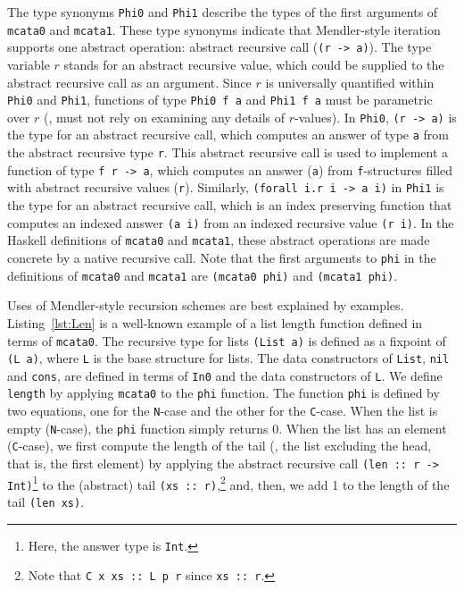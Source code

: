 The type synonyms \lstinline{Phi0} and \lstinline{Phi1} describe the types of
the first arguments of \lstinline{mcata0} and \lstinline{mcata1}.
These type synonyms indicate that Mendler-style iteration supports
one abstract operation: abstract recursive call (\lstinline{(r -> a)}).
The type variable $r$ stands for an abstract recursive value, which could
be supplied to the abstract recursive call as an argument. Since $r$ is
universally quantified within \lstinline{Phi0} and \lstinline{Phi1},
functions of type \lstinline{Phi0 f a} and \lstinline{Phi1 f a} must be
parametric over $r$ (\ie, must not rely on examining any details of $r$-values).
In \lstinline{Phi0}, \lstinline{(r -> a)} is the type for
an abstract recursive call, which computes an answer of type \lstinline{a}
from the abstract recursive type \lstinline{r}.
This abstract recursive call is used to implement a function of type
\lstinline{f r -> a}, which computes an answer (\lstinline{a}) from
\lstinline{f}-structures filled with abstract recursive values (\lstinline{r}).
Similarly, \lstinline{(forall i.r i -> a i)} in \lstinline{Phi1} is the type
for an abstract recursive call, which is an index preserving function that
computes an indexed answer \lstinline{(a i)} from an indexed recursive value
\lstinline{(r i)}. In the Haskell definitions of \lstinline{mcata0} and
\lstinline{mcata1}, these abstract operations are made concrete by
a native recursive call. Note that the first arguments to
\lstinline{phi} in the definitions of \lstinline{mcata0} and \lstinline{mcata1}
are \lstinline{(mcata0 phi)} and \lstinline{(mcata1 phi)}.

Uses of Mendler-style recursion schemes are best explained by examples.
Listing~\ref{lst:Len} is a well-known example of a list length function
defined in terms of \lstinline{mcata0}. The recursive type for lists
\lstinline{(List a)} is defined as a fixpoint of \lstinline{(L a)},
where \lstinline{L} is the base structure for lists. The data constructors
of \lstinline{List}, \lstinline{nil} and \lstinline{cons}, are defined
in terms of \lstinline{In0} and the data constructors of \lstinline{L}.
We define \lstinline{length} by applying \lstinline{mcata0} to
the \lstinline{phi} function. The function \lstinline{phi} is defined
by two equations, one for the \lstinline{N}-case and the other for
the \lstinline{C}-case. When the list is empty (\lstinline{N}-case),
the \lstinline{phi} function simply returns 0. When the list has an
element (\lstinline{C}-case), we first compute the length of the tail
(\ie, the list excluding the head, that is, the first element) by
applying the abstract recursive call \lstinline{(len :: r -> Int)}\footnote{
	Here, the answer type is \lstinline{Int}. }
to the (abstract) tail \lstinline{(xs :: r)},\footnote{
	Note that \lstinline{C x xs :: L p r} since \lstinline{xs :: r}.}
and, then, we add 1 to the length of the tail \lstinline{(len xs)}.

